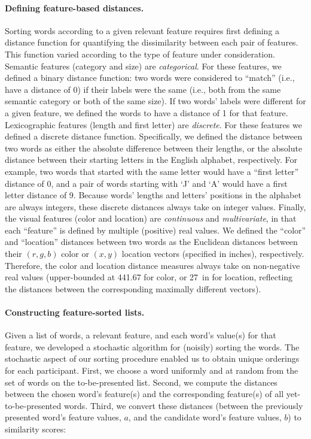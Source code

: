 \documentclass[11pt]{article}
\begin{document}
\paragraph{Defining feature-based distances.} Sorting words according to a
given relevant feature requires first defining a distance function for
quantifying the dissimilarity between each pair of features. This function
varied according to the type of feature under consideration. Semantic features
(category and size) are \textit{categorical}. For these features, we defined a
binary distance function: two words were considered to ``match'' (i.e., have a
distance of 0) if their labels were the same (i.e., both from the same semantic
category or both of the same size). If two words' labels were different for a
given feature, we defined the words to have a distance of 1 for that feature.
Lexicographic features (length and first letter) are \textit{discrete}. For
these features we defined a discrete distance function. Specifically, we
defined the distance between two words as either the absolute difference
between their lengths, or the absolute distance between their starting letters
in the English alphabet, respectively. For example, two words that started with
the same letter would have a ``first letter'' distance of 0, and a pair of
words starting with `J' and `A' would have a first letter distance of 9.
Because words' lengths and letters' positions in the alphabet are always
integers, these discrete distances always take on integer values. Finally, the
visual features (color and location) are \textit{continuous} and
\textit{multivariate}, in that each ``feature'' is defined by multiple
(positive) real values. We defined the ``color'' and ``location'' distances
between two words as the Euclidean distances between their $(r, g, b)$ color or
$(x, y)$ location vectors (specified in inches), respectively. Therefore, the
color and location distance measures always take on non-negative real values
(upper-bounded at 441.67 for color, or 27~in for location, reflecting the
distances between the corresponding maximally different vectors).

\paragraph{Constructing feature-sorted lists.} Given a list of words, a
relevant feature, and each word's value(s) for that feature, we developed a
stochastic algorithm for (noisily) sorting the words. The stochastic aspect of
our sorting procedure enabled us to obtain unique orderings for each
participant. First, we choose a word uniformly and at random from the set of
words on the to-be-presented list. Second, we compute the distances between the
chosen word's feature(s) and the corresponding feature(s) of all
yet-to-be-presented words. Third, we convert these distances (between the
previously presented word's feature values, $a$, and the candidate word's
feature values, $b$) to similarity scores:
\end{document}
